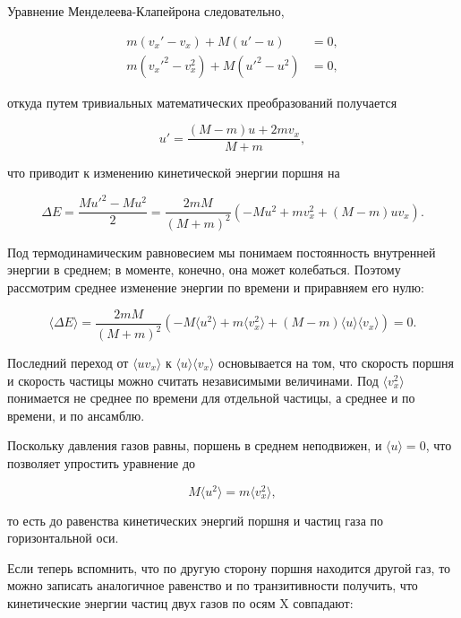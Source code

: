 \documentclass{article}
\begin{document}
\begin{section}{Уравнение Менделеева-Клапейрона}
		следовательно,

		\begin{align*}
			m(v_x'-v_x) + M(u'-u) &= 0, \\
			m(v_x'^2-v_x^2) + M(u'^2-u^2) &= 0,
		\end{align*}

		откуда путем тривиальных математических преобразований получается

		\begin{equation*}
			u' = \frac{(M - m) u + 2mv_x}{M + m},
		\end{equation*}

		что приводит к изменению кинетической энергии поршня на

		\begin{equation*}
			\Delta E = \frac{Mu'^2 - Mu^2}{2} = \frac{2mM}{(M + m)^2} \left( -M u^2 + m v_x^2 + (M - m) u v_x \right).
		\end{equation*}

		Под термодинамическим равновесием мы понимаем постоянность внутренней энергии в среднем; в моменте, конечно, она может колебаться. Поэтому рассмотрим среднее изменение энергии по времени и приравняем его нулю:

		\begin{equation*}
			\langle \Delta E \rangle = \frac{2mM}{(M + m)^2} \left( -M \langle u^2 \rangle + m \langle v_x^2 \rangle + (M - m) \langle u \rangle \langle v_x \rangle \right) = 0.
		\end{equation*}

		Последний переход от $\langle uv_x \rangle$ к $\langle u \rangle \langle v_x \rangle$ основывается на том, что скорость поршня и скорость частицы можно считать независимыми величинами. Под $\langle v_x^2 \rangle$ понимается не среднее по времени для отдельной частицы, а среднее и по времени, и по ансамблю.

		Поскольку давления газов равны, поршень в среднем неподвижен, и $\langle u \rangle = 0$, что позволяет упростить уравнение до

		\begin{equation*}
			M \langle u^2 \rangle = m \langle v_x^2 \rangle,
		\end{equation*}

		то есть до равенства кинетических энергий поршня и частиц газа по горизонтальной оси.

		Если теперь вспомнить, что по другую сторону поршня находится другой газ, то можно записать аналогичное равенство и по транзитивности получить, что кинетические энергии частиц двух газов по осям X совпадают:


\end{section}
\end{document}
